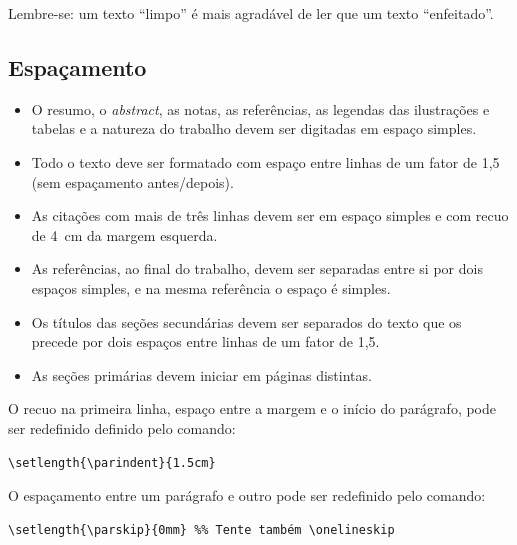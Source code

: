 \noindent Lembre-se: um texto ``limpo'' é mais agradável de ler que um texto ``enfeitado''.

\subsection{Espaçamento}\label{sec:espacamento}

\begin{itemize}%
\item O resumo, o \textit{abstract}, as notas, as referências, as legendas das ilustrações e tabelas e a natureza do trabalho devem ser digitadas em espaço simples.
\item Todo o texto deve ser formatado com espaço entre linhas de um fator de 1,5 (sem espaçamento antes/depois).
\item As citações com mais de três linhas devem ser em espaço simples e com recuo de \SI{4}{cm} da margem esquerda.
\item As referências, ao final do trabalho, devem ser separadas entre si por dois espaços simples, e na mesma referência o espaço é simples.
\item Os títulos das seções secundárias devem ser separados do texto que os precede por dois espaços entre linhas de um fator de 1,5.
\item As seções primárias devem iniciar em páginas distintas.
\end{itemize}

O recuo na primeira linha, espaço entre a margem e o início do parágrafo, pode ser redefinido definido pelo comando:

\begin{SingleSpacing}%
\begin{verbatim}
\setlength{\parindent}{1.5cm}
\end{verbatim}
\end{SingleSpacing}

O espaçamento entre um parágrafo e outro pode ser redefinido pelo comando:

\begin{SingleSpacing}%
\begin{verbatim}
\setlength{\parskip}{0mm} %% Tente também \onelineskip
\end{verbatim}
\end{SingleSpacing}

